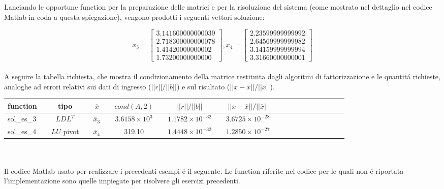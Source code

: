 \noindent Lanciando le opportune function per la preparazione delle matrici e per la risoluzione del sistema (come mostrato nel dettaglio nel codice Matlab in coda a questa spiegazione), vengono prodotti i seguenti vettori soluzione:

\[
x_3 = \begin{bmatrix} 3.141600000000039 \\ 2.718300000000078 \\ 1.41420000000002 \\ 1.73200000000000 \end{bmatrix},
x_4 = \begin{bmatrix} 2.23599999999992 \\ 2.64569999999982 \\ 3.14159999999994 \\ 3.31660000000001 \end{bmatrix}
\]
\\
\noindent A seguire la tabella richiesta, che mostra il condizionamento della matrice restituita dagli algoritmi di fattorizzazione e le quantit\'a richieste, analoghe ad errori relativi sui dati di ingresso (\(||r||/||b||\)) e sul risultato (\(||x-\overline{x}||/||\overline{x}||\)).
\\

\noindent\begin{tabular}{l*{20}{c}}
function & \vline& tipo & \vline& \(\overline{x}\) & \vline& \(cond(A, 2)\) & \vline& \(||r||/||b||\) & \vline& \(||x-\overline{x}||/||\overline{x}||\) \\
\hline
sol\_es\_3 & \vline& \(LDL^T\)    & \vline& \(\overline{x}_3\) & \vline& \(3.6158 \times 10^3\)    & \vline& \(1.1782 \times 10^{-32}\)	& \vline& \(3.6725 \times 10^{-28}\)   \\
sol\_es\_4 & \vline& \(LU\) pivot & \vline& \(\overline{x}_4\) & \vline& 319.10                    & \vline& \(1.4448 \times 10^{-32}\)	& \vline& \(1.2850 \times 10^{-27}\) 	 \\

\end{tabular}
\\
\\

\noindent Il codice Matlab usato per realizzare i precedenti esempi \'e il seguente. Le function riferite nel codice per le quali non \'e riportata l'implementazione sono quelle impiegate per risolvere gli esercizi precedenti.

